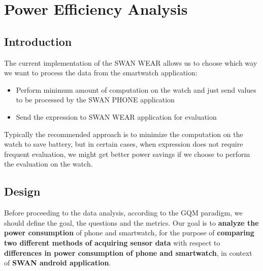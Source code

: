 
\chapter{Power Efficiency Analysis} %

\label{Chapter6} %



\section{Introduction}
The current implementation of the SWAN WEAR allows us to choose which way we want to process the data from the smartwatch application:
\begin{itemize}
 \item Perform minimum amount of computation on the watch and just send values to be processed by the SWAN PHONE application
 \item Send the expression to SWAN WEAR application for evaluation
\end{itemize}

Typically the recommended approach is to minimize the computation on the watch to save battery, but in certain cases,  when expression does not require frequent evaluation, we might get better power savings if we choose to perform the evaluation on the watch.

\section{Design}
Before proceeding to the data analysis, according to the GQM\cite{gqm_1}\cite{gqm_2} paradigm, we should define the goal, the questions and the metrics.
    Our goal is to \textbf{analyze the power consumption} of phone and smartwatch, for the purpose of \textbf{comparing two different methods of acquiring sensor data}
    with respect to \textbf{differences in power consumption of phone and smartwatch}, in context of \textbf{SWAN android application}.


